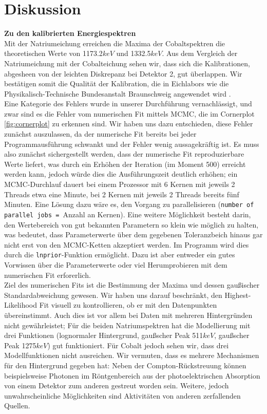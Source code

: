 \documentclass[%
aps,
onecolumn,
11pt,
tightenlines,
nofootinbib,
superscriptaddress,
floatfix,
prd,
]{revtex4-2}
\begin{document}
\section{Diskussion}
\label{sec:Diskussion}
\textbf{Zu den kalibrierten Energiespektren}\\
Mit der Natriumeichung erreichen die Maxima der Cobaltspektren die theoretischen Werte von 1173.2$keV$ und 1332.5$keV$. Aus dem Vergleich der Natriumeichung mit der Cobalteichung sehen wir, dass sich die Kalibrationen, abgesheen von der leichten Diskrepanz bei Detektor 2, gut überlappen. Wir bestätigen somit die Qualität der Kalibration, die in Eichlabors wie die Physikalisch-Technische Bundesanstalt Braunschweig angewendet wird \cite{manual1}.\\
Eine Kategorie des Fehlers wurde in unserer Durchführung vernachlässigt, und zwar sind es die Fehler vom numerischen Fit mittels MCMC, die im Cornerplot \ref{fig:cornerplot} zu erkennen sind. Wir haben uns dazu entschieden, diese Fehler zunächst auszulassen, da der numerische Fit bereits bei jeder Programmausführung schwankt und der Fehler wenig aussagekräftig ist. Es muss also zunächst sichergestellt werden, dass der numerische Fit reproduzierbare Werte liefert, was durch ein Erhöhen der Iteration (im Moment 500) erreicht werden kann, jedoch würde dies die Ausführungszeit deutlich erhöhen; ein MCMC-Durchlauf dauert bei einem Prozessor mit 6 Kernen mit jeweils 2 Threads etwa eine Minute, bei 2 Kernen mit jeweils 2 Threads bereits fünf Minuten. Eine Lösung dazu wäre es, den Vorgang zu parallelisieren (\texttt{number of parallel jobs = }Anzahl an Kernen). Eine weitere Möglichkeit besteht darin, den Wertebereich von gut bekannten Parametern so klein wie möglich zu halten, was bedeutet, dass Parameterwerte über dem gegebenen Toleranzbeich hinaus gar nicht erst von den MCMC-Ketten akzeptiert werden. Im Programm wird dies durch die \texttt{lnprior}-Funktion ermöglicht. Dazu ist aber entweder ein gutes Vorwissen über die Parameterwerte oder viel Herumprobieren mit dem numerischen Fit erforerlich.\\
Ziel des numerischen Fits ist die Bestimmung der Maxima und dessen gaußischer Standardabweichung gewesen. Wir haben uns darauf beschränkt, den Highest-Likelihood Fit visuell zu kontrollieren, ob er mit den Datenpunkten übereinstimmt. Auch dies ist vor allem bei Daten mit mehreren Hintergründen nicht gewährleistet; Für die beiden Natriumspektren hat die Modellierung mit drei Funktionen (lognormaler Hintergrund, gaußscher Peak 511$keV$, gaußscher Peak 1275$keV$) gut funktioniert. Für Cobalt jedoch sehen wir, dass drei Modellfunktionen nicht ausreichen. Wir vermuten, dass es mehrere Mechanismen für den Hintergrund gegeben hat: Neben der Compton-Rückstreuung können beispielsweise Photonen im Röntgenbereich aus der photoelektrischen Absorption von einem Detektor zum anderen gestreut worden sein. Weitere, jedoch unwahrscheinliche Möglichkeiten sind Aktivitäten von anderen zerfallenden Quellen. \vspace{10pt}\\
\end{document}
